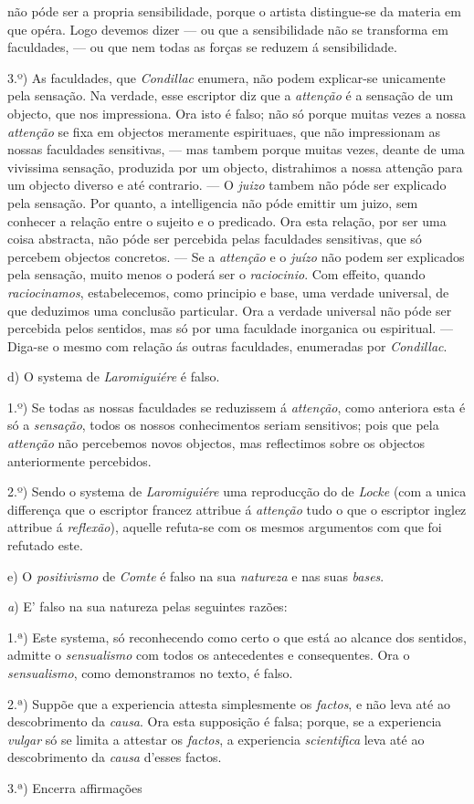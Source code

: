 não póde ser a propria sensibilidade, porque o artista distingue-se da materia em que opéra. Logo devemos dizer --- ou que a sensibilidade não se transforma em faculdades, --- ou que nem todas as forças se reduzem á sensibilidade.\par 3.º) As faculdades, que \emph{Condillac} enumera, não podem explicar-se unicamente pela sensação. Na verdade, esse escriptor diz que a \emph{attenção} é a sensação de um objecto, que nos impressiona. Ora isto é falso; não só porque muitas vezes a nossa \emph{attenção} se fixa em objectos meramente espirituaes, que não impressionam as nossas faculdades sensitivas, --- mas tambem porque muitas vezes, deante de uma vivissima sensação, produzida por um objecto, distrahimos a nossa attenção para um objecto diverso e até contrario. --- O \emph{juizo} tambem não póde ser explicado pela sensação. Por quanto, a intelligencia não póde emittir um juizo, sem conhecer a relação entre o sujeito e o predicado. Ora esta relação, por ser uma coisa abstracta, não póde ser percebida pelas faculdades sensitivas, que só percebem objectos concretos. --- Se a \emph{attenção} e o \emph{juízo} não podem ser explicados pela sensação, muito menos o poderá ser o \emph{raciocinio}. Com effeito, quando \emph{raciocinamos}, estabelecemos, como principio e base, uma verdade universal, de que deduzimos uma conclusão particular. Ora a verdade universal não póde ser percebida pelos sentidos, mas só por uma faculdade inorganica ou espiritual. --- Diga-se o mesmo com relação ás outras faculdades, enumeradas por \emph{Condillac}.\par d) O systema de \emph{Laromiguiére} é falso.\par 1.º) Se todas as nossas faculdades se reduzissem á \emph{attenção}, como anteriora esta é só a \emph{sensação}, todos os nossos conhecimentos seriam sensitivos; pois que pela \emph{attenção} não percebemos novos objectos, mas reflectimos sobre os objectos anteriormente percebidos.\par 2.º) Sendo o systema de \emph{Laromiguiére} uma reproducção do de \emph{Locke} (com a unica differença que o escriptor francez attribue á \emph{attenção} tudo o que o escriptor inglez attribue á \emph{reflexão}), aquelle refuta-se com os mesmos argumentos com que foi refutado este.\par e) O \emph{positivismo} de \emph{Comte} é falso na sua \emph{natureza} e nas suas \emph{bases}.\par \emph{a}) E' falso na sua natureza pelas seguintes razões:\par 1.ª) Este systema, só reconhecendo como certo o que está ao alcance dos sentidos, admitte o \emph{sensualismo} com todos os antecedentes e consequentes. Ora o \emph{sensualismo}, como demonstramos no texto, é falso.\par 2.ª) Suppõe que a experiencia attesta simplesmente os \emph{factos}, e não leva até ao descobrimento da \emph{causa}. Ora esta supposição é falsa; porque, se a experiencia \emph{vulgar} só se limita a attestar os \emph{factos}, a experiencia \emph{scientifica} leva até ao descobrimento da \emph{causa} d'esses factos.\par 3.ª) Encerra affirmações 